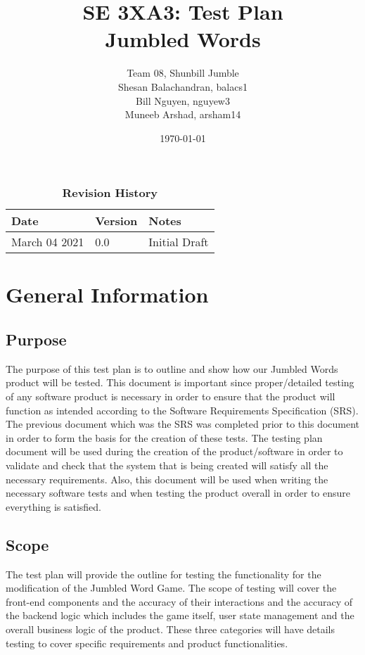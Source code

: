 \documentclass[12pt, titlepage]{article}
\title{SE 3XA3: Test Plan\\Jumbled Words}
\author{Team 08, Shunbill Jumble
	\\Shesan Balachandran, balacs1
	\\Bill Nguyen, nguyew3
	\\Muneeb Arshad, arsham14
}
\date{\today}
\begin{document}
\maketitle

\tableofcontents
\listoftables
\listoffigures

\newpage
\begin{table}[bp]
	\caption{\bf Revision History}
	\begin{tabularx}{\textwidth}{p{3cm}p{2cm}X}
		\toprule {\bf Date} & {\bf Version} & {\bf Notes}\\
		\midrule
		March 04 2021 & 0.0 & Initial Draft\\
		\bottomrule
	\end{tabularx}
\end{table}

\clearpage


\section{General Information}

\subsection{Purpose}

The purpose of this test plan is to outline and show how our Jumbled Words product will be tested. This document is important since proper/detailed testing of any software product is necessary in order to ensure that the product will function as intended according to the Software Requirements Specification (SRS). The previous document which was the SRS was completed prior to this document in order to form the basis for the creation of these tests. The testing plan document will be used during the creation of the product/software in order to validate and check that the system that is being created will satisfy all the necessary requirements. Also, this document will be used when writing the necessary software tests and when testing the product overall in order to ensure everything is satisfied.

\subsection{Scope}

The test plan will provide the outline for testing the functionality for the modification of the Jumbled Word Game. The scope of testing will cover the front-end components and the accuracy of their interactions and the accuracy of the backend logic which includes the game itself, user state management and the overall business logic of the product. These three categories will have details testing to cover specific requirements and product functionalities.
\end{document}
